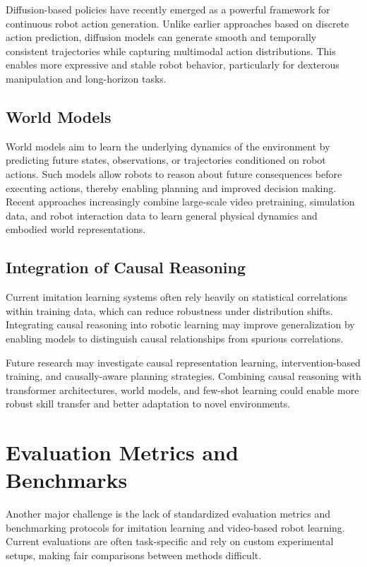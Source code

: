 Diffusion-based policies have recently emerged as a powerful framework for continuous robot action generation. Unlike earlier approaches based on discrete action prediction, diffusion models can generate smooth and temporally consistent trajectories while capturing multimodal action distributions. This enables more expressive and stable robot behavior, particularly for dexterous manipulation and long-horizon tasks.

\subsection{World Models}

World models aim to learn the underlying dynamics of the environment by predicting future states, observations, or trajectories conditioned on robot actions. Such models allow robots to reason about future consequences before executing actions, thereby enabling planning and improved decision making. Recent approaches increasingly combine large-scale video pretraining, simulation data, and robot interaction data to learn general physical dynamics and embodied world representations.

\subsection{Integration of Causal Reasoning}

Current imitation learning systems often rely heavily on statistical correlations within training data, which can reduce robustness under distribution shifts. Integrating causal reasoning into robotic learning may improve generalization by enabling models to distinguish causal relationships from spurious correlations.

Future research may investigate causal representation learning, intervention-based training, and causally-aware planning strategies. Combining causal reasoning with transformer architectures, world models, and few-shot learning could enable more robust skill transfer and better adaptation to novel environments.

\section{Evaluation Metrics and Benchmarks}

Another major challenge is the lack of standardized evaluation metrics and benchmarking protocols for imitation learning and video-based robot learning. Current evaluations are often task-specific and rely on custom experimental setups, making fair comparisons between methods difficult.

